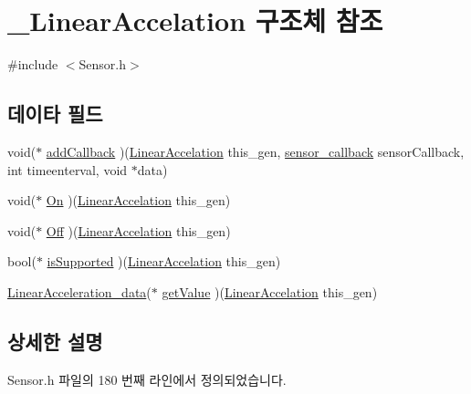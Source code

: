 \hypertarget{struct___linear_accelation}{\section{\-\_\-\-Linear\-Accelation 구조체 참조}
\label{struct___linear_accelation}
}


{\ttfamily \#include $<$Sensor.\-h$>$}

\subsection*{데이타 필드}
\begin{DoxyCompactItemize}
\item 
void($\ast$ \hyperlink{struct___linear_accelation_a8951a1ec6ac7c7aea7f13701f0179f7e}{add\-Callback} )(\hyperlink{_sensor_8h_ab6e374e44978536ed25c1f68f0cb0268}{Linear\-Accelation} this\-\_\-gen, \hyperlink{_sensor_8h_ad8114207845fc5e0aa30832f0c718cd6}{sensor\-\_\-callback} sensor\-Callback, int timeenterval, void $\ast$data)
\item 
void($\ast$ \hyperlink{struct___linear_accelation_a94a5c6752cd1bf18e8d4f1aff25c88e8}{On} )(\hyperlink{_sensor_8h_ab6e374e44978536ed25c1f68f0cb0268}{Linear\-Accelation} this\-\_\-gen)
\item 
void($\ast$ \hyperlink{struct___linear_accelation_a5ecc7fba6af596a66129373e0157f9a2}{Off} )(\hyperlink{_sensor_8h_ab6e374e44978536ed25c1f68f0cb0268}{Linear\-Accelation} this\-\_\-gen)
\item 
bool($\ast$ \hyperlink{struct___linear_accelation_afc42a6003589d08871b06adfc3f2ee9c}{is\-Supported} )(\hyperlink{_sensor_8h_ab6e374e44978536ed25c1f68f0cb0268}{Linear\-Accelation} this\-\_\-gen)
\item 
\hyperlink{_sensor_8h_ab972181c85e723d7d5b22be3b9519281}{Linear\-Acceleration\-\_\-data}($\ast$ \hyperlink{struct___linear_accelation_aaf02870c60aa510568b3376a4cd4d965}{get\-Value} )(\hyperlink{_sensor_8h_ab6e374e44978536ed25c1f68f0cb0268}{Linear\-Accelation} this\-\_\-gen)
\end{DoxyCompactItemize}


\subsection{상세한 설명}


Sensor.\-h 파일의 180 번째 라인에서 정의되었습니다.



